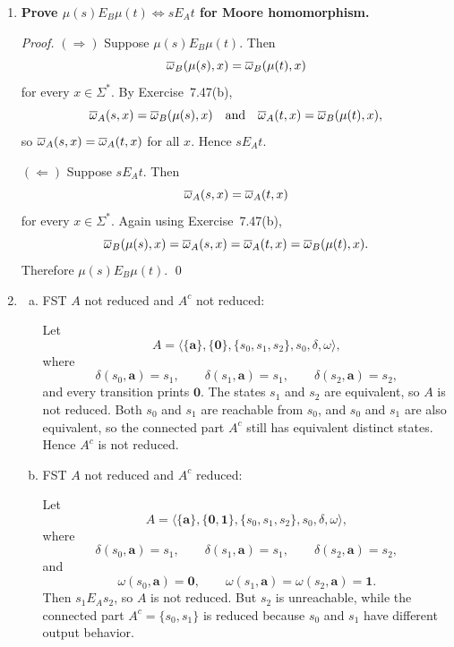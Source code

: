 \begin{enumerate}[{7.}1.]
\begin{proof}
$(\Leftarrow)$ If $s E_A t$: $\OBAR_A(s,x)=\OBAR_A(t,x)$ for all $x$.  So $\OBAR_B(\mu(s),x)=\OBAR_A(s,x)=\OBAR_A(t,x)=\OBAR_B(\mu(t),x)$, giving $\mu(s) E_B \mu(t)$. \qed
\end{proof}

\item \textbf{Prove $\mu(s) E_B \mu(t) \Leftrightarrow s E_A t$ for Moore homomorphism.}

\begin{proof}
$(\Rightarrow)$ Suppose $\mu(s) E_B \mu(t)$.  Then
\[
  \overline{\omega}_B(\mu(s),x)=\overline{\omega}_B(\mu(t),x)
\]
for every $x\in\Sigma^*$.  By Exercise~7.47(b),
\[
  \overline{\omega}_A(s,x)=\overline{\omega}_B(\mu(s),x)
  \quad\text{and}\quad
  \overline{\omega}_A(t,x)=\overline{\omega}_B(\mu(t),x),
\]
so $\OBAR_A(s,x)=\OBAR_A(t,x)$ for all $x$.  Hence $s E_A t$.

$(\Leftarrow)$ Suppose $s E_A t$.  Then
\[
  \overline{\omega}_A(s,x)=\overline{\omega}_A(t,x)
\]
for every $x\in\Sigma^*$.  Again using Exercise~7.47(b),
\[
  \overline{\omega}_B(\mu(s),x)=\overline{\omega}_A(s,x)=\overline{\omega}_A(t,x)=\overline{\omega}_B(\mu(t),x).
\]
Therefore $\mu(s) E_B \mu(t)$. \qed
\end{proof}

\item \begin{enumerate}[(a)]
  \item FST $A$ not reduced and $A^c$ not reduced:

  Let
  \[
    A=\langle\{\pmb{a}\},\{\pmb{0}\},\{s_0,s_1,s_2\},s_0,\delta,\omega\rangle,
  \]
  where
  \[
    \delta(s_0,\pmb{a})=s_1,\qquad
    \delta(s_1,\pmb{a})=s_1,\qquad
    \delta(s_2,\pmb{a})=s_2,
  \]
  and every transition prints $\pmb{0}$.  The states $s_1$ and $s_2$ are
  equivalent, so $A$ is not reduced.  Both $s_0$ and $s_1$ are reachable from
  $s_0$, and $s_0$ and $s_1$ are also equivalent, so the connected part $A^c$
  still has equivalent distinct states.  Hence $A^c$ is not reduced.

  \item FST $A$ not reduced and $A^c$ reduced:

  Let
  \[
    A=\langle\{\pmb{a}\},\{\pmb{0},\pmb{1}\},\{s_0,s_1,s_2\},s_0,\delta,\omega\rangle,
  \]
  where
  \[
    \delta(s_0,\pmb{a})=s_1,\qquad
    \delta(s_1,\pmb{a})=s_1,\qquad
    \delta(s_2,\pmb{a})=s_2,
  \]
  and
  \[
    \omega(s_0,\pmb{a})=\pmb{0},\qquad
    \omega(s_1,\pmb{a})=\omega(s_2,\pmb{a})=\pmb{1}.
  \]
  Then $s_1 E_A s_2$, so $A$ is not reduced.  But $s_2$ is unreachable, while
  the connected part $A^c=\{s_0,s_1\}$ is reduced because $s_0$ and $s_1$ have
  different output behavior.
\end{enumerate}


\end{enumerate}
